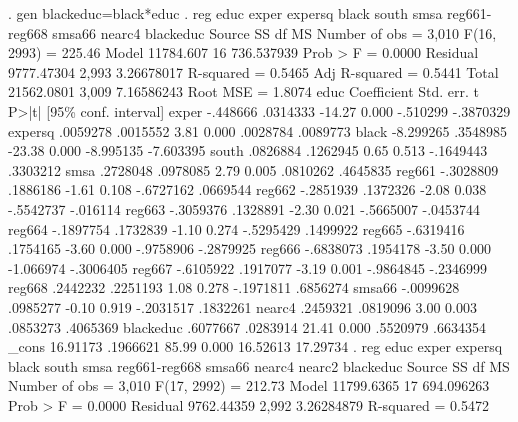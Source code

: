 . gen blackeduc=black*educ
{\smallskip}
. reg educ exper expersq black south smsa reg661-reg668 smsa66 nearc4 blackeduc
{\smallskip}
      Source {\VBAR}       SS           df       MS      Number of obs   =     3,010
   F(16, 2993)     =    225.46
       Model {\VBAR}   11784.607        16  736.537939   Prob > F        =    0.0000
    Residual {\VBAR}  9777.47304     2,993  3.26678017   R-squared       =    0.5465
   Adj R-squared   =    0.5441
       Total {\VBAR}  21562.0801     3,009  7.16586243   Root MSE        =    1.8074
{\smallskip}
        educ {\VBAR} Coefficient  Std. err.      t    P>|t|     [95\% conf. interval]
       exper {\VBAR}   -.448666   .0314333   -14.27   0.000     -.510299   -.3870329
     expersq {\VBAR}   .0059278   .0015552     3.81   0.000     .0028784    .0089773
       black {\VBAR}  -8.299265   .3548985   -23.38   0.000    -8.995135   -7.603395
       south {\VBAR}   .0826884   .1262945     0.65   0.513    -.1649443    .3303212
        smsa {\VBAR}   .2728048   .0978085     2.79   0.005     .0810262    .4645835
      reg661 {\VBAR}  -.3028809   .1886186    -1.61   0.108    -.6727162    .0669544
      reg662 {\VBAR}  -.2851939   .1372326    -2.08   0.038    -.5542737    -.016114
      reg663 {\VBAR}  -.3059376   .1328891    -2.30   0.021    -.5665007   -.0453744
      reg664 {\VBAR}  -.1897754   .1732839    -1.10   0.274    -.5295429    .1499922
      reg665 {\VBAR}  -.6319416   .1754165    -3.60   0.000    -.9758906   -.2879925
      reg666 {\VBAR}  -.6838073   .1954178    -3.50   0.000    -1.066974   -.3006405
      reg667 {\VBAR}  -.6105922   .1917077    -3.19   0.001    -.9864845   -.2346999
      reg668 {\VBAR}   .2442232   .2251193     1.08   0.278    -.1971811    .6856274
      smsa66 {\VBAR}  -.0099628   .0985277    -0.10   0.919    -.2031517    .1832261
      nearc4 {\VBAR}   .2459321   .0819096     3.00   0.003     .0853273    .4065369
   blackeduc {\VBAR}   .6077667   .0283914    21.41   0.000     .5520979    .6634354
       _cons {\VBAR}   16.91173   .1966621    85.99   0.000     16.52613    17.29734
{\smallskip}
. reg educ exper expersq black south smsa reg661-reg668 smsa66 nearc4 nearc2 blackeduc
{\smallskip}
      Source {\VBAR}       SS           df       MS      Number of obs   =     3,010
   F(17, 2992)     =    212.73
       Model {\VBAR}  11799.6365        17  694.096263   Prob > F        =    0.0000
    Residual {\VBAR}  9762.44359     2,992  3.26284879   R-squared       =    0.5472
